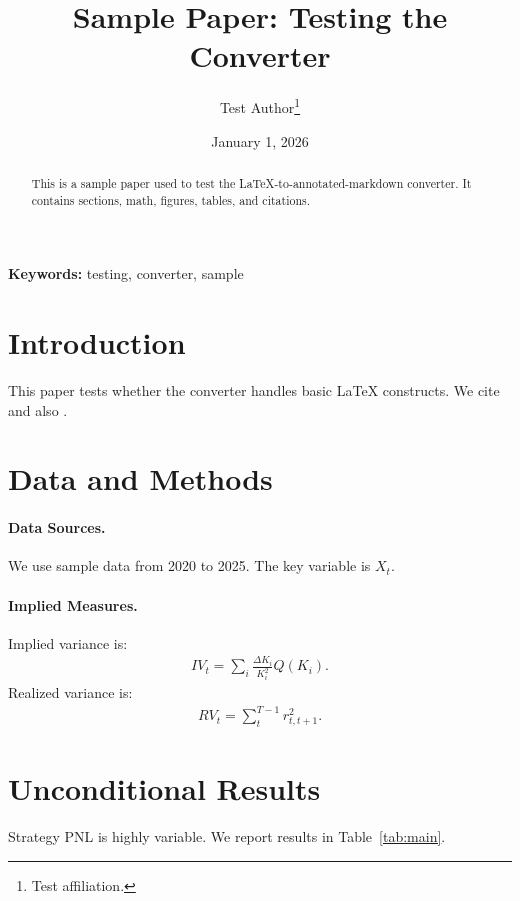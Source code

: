 \documentclass[11pt]{article}
\newcommand{\titleText}{Sample Paper: Testing the Converter}
\begin{document}
\title{\Large \bf \titleText}
\author{{\large Test Author}\thanks{Test affiliation.}}
\date{{\large January 1, 2026}}
\maketitle

\begin{abstract}
\noindent
This is a sample paper used to test the LaTeX-to-annotated-markdown converter.
It contains sections, math, figures, tables, and citations.
\end{abstract}

\noindent \textbf{Keywords:} testing, converter, sample

\section{Introduction}
\label{sect:intro}

This paper tests whether the converter handles basic LaTeX constructs.
We cite \citealp{AuthorA2025} and also \citet{AuthorB2026}.

\section{Data and Methods}
\label{sect:data}

\paragraph{Data Sources.}
We use sample data from 2020 to 2025. The key variable is $X_t$.

\paragraph{Implied Measures.}
Implied variance is:
\begin{align}
    IV_t = \sum_i \frac{\Delta K_i}{K_i^2} Q(K_i).
\end{align}\label{eq:iv}
Realized variance is:
\begin{align}\label{eq:rv}
    RV_t = \sum_{t}^{T-1} r_{t,t+1}^2.
\end{align}

\section{Unconditional Results}
\label{sect:uncond}

Strategy PNL is highly variable. We report results in Table~\ref{tab:main}.
\end{document}
